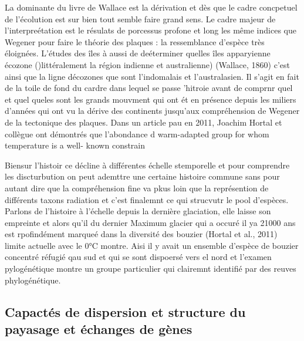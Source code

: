 La dominante du livre de Wallace est la dérivation et dès que le cadre
concpetuel de l'écolution est sur bien tout semble faire grand sens. Le
cadre majeur de l'interpreétation est le résulats de porcessus profone
et long les même indices que Wegener pour faire le théorie des plaques :
la ressemblance d'espèce très éloignées. L'études des îles à aussi de
deéterminer quelles îles apparyienne écozone ()littéralement la région
indienne et australienne) (Wallace, 1860) c'est ainsi que la ligne
décozones que sont l'indomalais et l'australasien. Il s'agit en fait de
la toile de fond du cardre dans lequel se passe 'hitroie avant de
comprnr quel et quel queles sont les grands mouvment qui ont ét en
présence depuis les miliers d'années qui ont vu la dérive des continents
jusqu'aux compréhension de Wegener de la tectonique des plaques. Dans un
article pau en 2011, Joachim Hortal et collègue ont démontrés que
l'abondance d warm-adapted group for whom temperature is a well- known
constrain

Biensur l'histoir ce décline à différentes échelle stemporelle et pour
comprendre les discturbution on peut ademttre une certaine histoire
commune sans pour autant dire que la compréhension fine va pkus loin que
la représention de différents taxons radiation et c'est finalemnt ce qui
strucvutr le pool d'espèces. Parlons de l'histoire à l'échelle depuis la
dernière glaciation, elle laisse son empreinte et alors qu'il du dernier
Maximum glacier qui a occuré il ya 21000 ans est rpofindément marqueé
dans la diversité des bouzier (Hortal et al., 2011) limite actuelle avec
le 0°C montre. Aisi il y avait un ensemble d'espèce de bouzier concentré
réfugié qau sud et qui se sont dispoersé vers el nord et l'examen
pylogénétique montre un groupe particulier qui clairemnt identifié par
des reuves phylogénétique.

\subsection*{Capactés de dispersion et structure du payasage et échanges
de
gènes}\label{capactuxe9s-de-dispersion-et-structure-du-payasage-et-uxe9changes-de-guxe8nes}

